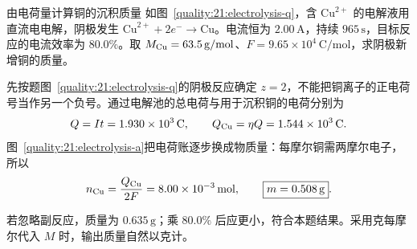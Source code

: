 \begin{origexamplebox}{由电荷量计算铜的沉积质量}\label{quality:21:ex:electrolysis}
如图~\ref{quality:21:electrolysis-q}，含 $\mathrm{Cu}^{2+}$ 的电解液用直流电电解，阴极发生
$\mathrm{Cu}^{2+}+2e^-\to\mathrm{Cu}$。电流恒为 $2.00\,\mathrm A$，持续 $965\,\mathrm s$，目标反应的电流效率为 $80.0\%$。取 $M_{\rm Cu}=63.5\,\mathrm{g/mol}$、$F=9.65\times10^4\,\mathrm{C/mol}$，求阴极新增铜的质量。
\begin{qualityfigure}
\label{quality:21:electrolysis-q}
\end{qualityfigure}
\end{origexamplebox}
\begin{xesolution}
先按题图~\ref{quality:21:electrolysis-q}的阴极反应确定 $z=2$，不能把铜离子的正电荷号当作另一个负号。通过电解池的总电荷与用于沉积铜的电荷分别为
\[
 Q=It=1.930\times10^3\,\mathrm C,\qquad Q_{\rm Cu}=\eta Q=1.544\times10^3\,\mathrm C.
\]
图~\ref{quality:21:electrolysis-a}把电荷账逐步换成物质量：每摩尔铜需两摩尔电子，所以
\[
 n_{\rm Cu}=\frac{Q_{\rm Cu}}{2F}=8.00\times10^{-3}\,\mathrm{mol},\qquad
 \boxed{m=0.508\,\mathrm g}.
\]
\begin{qualityfigure}
\label{quality:21:electrolysis-a}
\end{qualityfigure}
若忽略副反应，质量为 $0.635\,\mathrm g$；乘 $80.0\%$ 后应更小，符合本题结果。采用克每摩尔代入 $M$ 时，输出质量自然以克计。
\end{xesolution}


